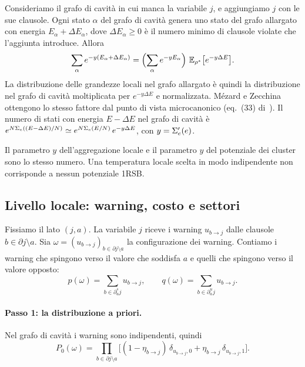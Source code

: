Consideriamo il grafo di cavità in cui manca la variabile $j$, e aggiungiamo $j$ con le sue clausole.
Ogni stato $\alpha$ del grafo di cavità genera uno stato del grafo allargato con energia $E_\alpha+\Delta E_\alpha$, dove $\Delta E_\alpha\ge0$ è il numero minimo di clausole violate che l'aggiunta introduce.
Allora
\begin{equation}
\sum_{\alpha}e^{-y(E_\alpha+\Delta E_\alpha)}=\Bigl(\sum_\alpha e^{-yE_\alpha}\Bigr)\ \E_{\rho^*}\bigl[e^{-y\Delta E}\bigr].
\label{eq:reweight}
\end{equation}
La distribuzione delle grandezze locali nel grafo allargato è quindi la distribuzione nel grafo di cavità moltiplicata per $e^{-y\Delta E}$ e normalizzata.
Mézard e Zecchina ottengono lo stesso fattore dal punto di vista microcanonico (eq.~(33) di~\citep{mezard2002random}).
Il numero di stati con energia $E-\Delta E$ nel grafo di cavità è $e^{N\Sigma_e((E-\Delta E)/N)}\simeq e^{N\Sigma_e(E/N)}\,e^{-y\Delta E}$, con $y=\Sigma_e'(e)$.

\begin{osservazione}
\label{oss:no-free-T}
Il parametro $y$ dell'aggregazione locale e il parametro $y$ del potenziale dei cluster sono lo stesso numero.
Una temperatura locale scelta in modo indipendente non corrisponde a nessun potenziale 1RSB.
\end{osservazione}

\subsection{Livello locale: warning, costo e settori}

Fissiamo il lato $(j,a)$.
La variabile $j$ riceve i warning $u_{b\to j}$ dalle clausole $b\in\partial j\setminus a$.
Sia $\omega=(u_{b\to j})_{b\in\partial j\setminus a}$ la configurazione dei warning.
Contiamo i warning che spingono verso il valore che soddisfa $a$ e quelli che spingono verso il valore opposto:
\begin{equation}
p(\omega)=\sum_{b\in\partial^s_aj}u_{b\to j},\qquad q(\omega)=\sum_{b\in\partial^u_aj}u_{b\to j}.
\end{equation}

\paragraph{Passo 1: la distribuzione a priori.}
Nel grafo di cavità i warning sono indipendenti, quindi
\begin{equation}
P_0(\omega)=\prod_{b\in\partial j\setminus a}\bigl[(1-\eta_{b\to j})\,\delta_{u_{b\to j},0}+\eta_{b\to j}\,\delta_{u_{b\to j},1}\bigr].
\label{eq:prior}
\end{equation}

